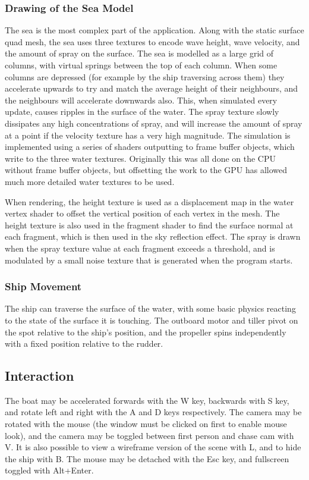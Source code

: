 \documentclass[a4paper,11pt]{article}
\begin{document}
\subsubsection{Drawing of the Sea Model}
The sea is the most complex part of the application. Along with the static surface quad mesh, the sea uses three textures to encode wave height, wave velocity, and the amount of spray on the surface. The sea is modelled as a large grid of columns, with virtual springs between the top of each column. When some columns are depressed (for example by the ship traversing across them) they accelerate upwards to try and match the average height of their neighbours, and the neighbours will accelerate downwards also. This, when simulated every update, causes ripples in the surface of the water. The spray texture slowly dissipates any high concentrations of spray, and will increase the amount of spray at a point if the velocity texture has a very high magnitude. The simulation is implemented using a series of shaders outputting to frame buffer objects, which write to the three water textures. Originally this was all done on the CPU without frame buffer objects, but offsetting the work to the GPU has allowed much more detailed water textures to be used.

When rendering, the height texture is used as a displacement map in the water vertex shader to offset the vertical position of each vertex in the mesh. The height texture is also used in the fragment shader to find the surface normal at each fragment, which is then used in the sky reflection effect. The spray is drawn when the spray texture value at each fragment exceeds a threshold, and is modulated by a small noise texture that is generated when the program starts.

\subsubsection{Ship Movement}
The ship can traverse the surface of the water, with some basic physics reacting to the state of the surface it is touching. The outboard motor and tiller pivot on the spot relative to the ship's position, and the propeller spins independently with a fixed position relative to the rudder.

\subsection{Interaction}
The boat may be accelerated forwards with the W key, backwards with S key, and rotate left and right with the A and D keys respectively. The camera may be rotated with the mouse (the window must be clicked on first to enable mouse look), and the camera may be toggled between first person and chase cam with V. It is also possible to view a wireframe version of the scene with L, and to hide the ship with B. The mouse may be detached with the Esc key, and fullscreen toggled with Alt+Enter.
\end{document}
